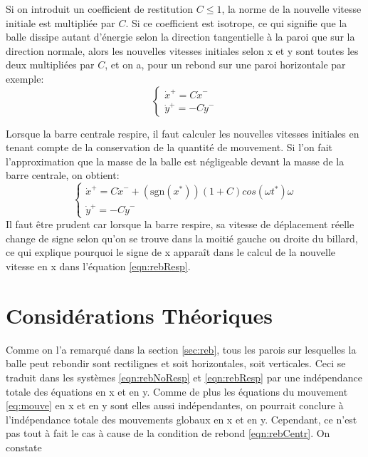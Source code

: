 \documentclass[a4paper]{report}
\begin{document}
Si on introduit un coefficient de restitution \(C \leq 1 \), la norme de la nouvelle vitesse initiale est multipliée par \(C\). Si ce coefficient est isotrope, ce qui signifie que la balle dissipe autant d'énergie selon la direction tangentielle à la paroi que sur la direction normale, alors les nouvelles vitesses initiales selon x et y sont toutes les deux multipliées par \(C\), et on a, pour un rebond sur une paroi horizontale par exemple:
\begin{equation}
\label{eqn:rebNoResp}
\begin{cases}
\dot{x}^+=C \dot{x}^-\\
\dot{y}^+=-C \dot{y}^-
\end{cases}
\end{equation}

Lorsque la barre centrale respire, il faut calculer les nouvelles vitesses initiales en tenant compte de la conservation de la quantité de mouvement. Si l'on fait l'approximation que la masse de la balle est négligeable devant la masse de la barre centrale, on obtient:
\begin{equation}
\label{eqn:rebResp}
\begin{cases}
\dot{x}^+=C\dot{x}^- +  (\text{sgn}(x^*))(1+C)cos(\omega t^*)\omega\\
\dot{y}^+=-C \dot{y}^-
\end{cases}
\end{equation}
Il faut être prudent car lorsque la barre respire, sa vitesse de déplacement réelle change de signe selon qu'on se trouve dans la moitié gauche ou droite du billard, ce qui explique pourquoi le signe de x apparaît dans le calcul de la nouvelle vitesse en x dans l'équation \ref{eqn:rebResp}.

\section{Considérations Théoriques}
Comme on l'a remarqué dans la section \ref{sec:reb}, tous les parois sur lesquelles la balle peut rebondir sont rectilignes et soit horizontales, soit verticales. Ceci se traduit dans les systèmes \ref{eqn:rebNoResp} et \ref{eqn:rebResp} par une indépendance totale des équations en x et en y. Comme de plus les équations du mouvement \ref{eq:mouve} en x et en y sont elles aussi indépendantes, on pourrait conclure à l'indépendance totale des mouvements globaux en x et en y. Cependant, ce n'est pas tout à fait le cas à cause de la condition de rebond \ref{eqn:rebCentr}. On constate
\end{document}
